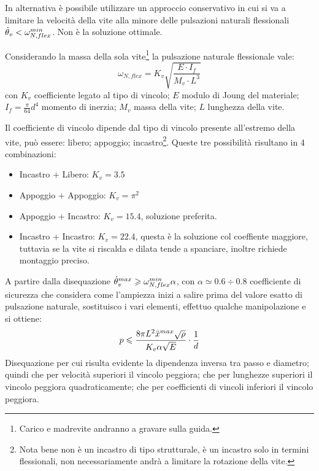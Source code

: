 In alternativa è possibile utilizzare un approccio conservativo in cui si va a limitare la velocità della vite alla minore delle pulsazioni naturali flessionali \( \dot{\theta}_v < \omega_{N,flex}^{min} \). Non è la soluzione ottimale.

Considerando la massa della sola vite\footnote{Carico e madrevite andranno a gravare sulla guida.} la pulsazione naturale flessionale vale:
\[ \omega_{N,flex} = K_v \sqrt{\frac{E \cdot I_f}{M_v \cdot L^3}} \]
con \( K_v \) coefficiente legato al tipo di vincolo; \( E \) modulo di Joung del materiale; \( I_f = \frac{\pi}{64}d^4 \) momento di inerzia; \( M_v \) massa della vite; \( L \) lunghezza della vite.

Il coefficiente di vincolo dipende dal tipo di vincolo presente all'estremo della vite, può essere: libero; appoggio; incastro\footnote{Nota bene non è un incastro di tipo strutturale, è un incastro solo in termini flessionali, non necessariamente andrà a limitare la rotazione della vite.}.
Queste tre possibilità risultano in 4 combinazioni:
\begin{itemize}
    \item Incastro + Libero: \(K_v = 3.5\)
    \item Appoggio + Appoggio: \(K_v = \pi^2\)
    \item Appoggio + Incastro: \(K_v = 15.4\), soluzione preferita.
    \item Incastro + Incastro: \(K_v = 22.4\), questa è la soluzione col coeffiente maggiore, tuttavia se la vite si riscalda e dilata tende a spanciare, inoltre richiede montaggio preciso.
\end{itemize}

A partire dalla disequazione \( \dot{\theta}_v^{max} \geqslant \omega_{N,flex}^{min} \alpha \), con \( \alpha \simeq 0.6\div 0.8 \) coefficiente di sicurezza che considera come l'ampiezza inizi a salire prima del valore esatto di pulsazione naturale, sostituisco i vari elementi, effettuo qualche manipolazione e si ottiene:
\[ p \leqslant \frac{8\pi L^2 \Ddot{x}^{max} \sqrt{\rho}}{K_v \alpha \sqrt{E}} \cdot \frac{1}{d} \]
Disequazione per cui risulta evidente la dipendenza inversa tra passo e diametro; quindi che per velocità superiori il vincolo peggiora; che per lunghezze superiori il vincolo peggiora quadraticamente; che per coefficienti di vincoli inferiori il vincolo peggiora.

